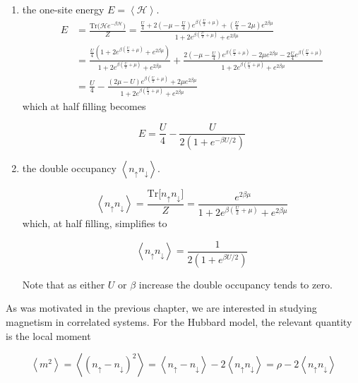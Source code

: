 \begin{enumerate}
\item the one-site energy $E = \left\langle \mathcal{H} \right\rangle$.
\begin{equation}
\begin{split}
E &= \frac{\text{Tr}\bigg( \mathcal{H}e^{-\beta\mathcal{H} } \bigg)}{Z} = \frac{ \frac{U}{4} + 2 ( -\mu - \frac{U}{4} ) e^{\beta(\frac{U}{2} + \mu )} + (\frac{U}{4} - 2\mu ) e^{2\beta\mu}}{1 + 2 e^{\beta (\frac{U}{2} + \mu )} + e^{2\beta\mu} } \\
&= \frac{ \frac{U}{4} ( 1 + 2 e^{\beta (\frac{U}{2} + \mu )} + e^{2\beta\mu} )}{1 + 2 e^{\beta (\frac{U}{2} + \mu )} + e^{2\beta\mu} } + \frac{2(-\mu - \frac{U}{4}) e^{\beta(\frac{U}{2} + \mu)} - 2\mu e^{2\beta\mu} - 2\frac{U}{4} e^{\beta (\frac{U}{2} + \mu)} }{1 + 2 e^{\beta (\frac{U}{2} + \mu )} + e^{2\beta\mu}} \\
&= \frac{U}{4} - \frac{ (2\mu - U) e^{\beta(\frac{U}{2} + \mu) } + 2\mu e^{2\beta\mu} }{1 + 2 e^{\beta (\frac{U}{2} + \mu )} + e^{2\beta\mu} }
\end{split}
\end{equation}
which at half filling becomes

\begin{equation}
E = \frac{U}{4} - \frac{U}{2 ( 1 + e^{-\beta U /2} )}
\end{equation}

\item the double occupancy $\left\langle n_\uparrow n_\downarrow \right\rangle$.

\begin{equation}
\left\langle n_\uparrow n_\downarrow \right\rangle = \frac{\text{Tr} \big[ n_\uparrow n_\downarrow \big]}{Z} = \frac{e^{2\beta\mu}}{1 + 2 e^{\beta (\frac{U}{2} + \mu )} + e^{2\beta\mu}}
\end{equation}
which, at half filling, simplifies to

\begin{equation}
\left\langle n_\uparrow n_\downarrow \right\rangle = \frac{1}{2 ( 1 + e^{\beta U/2} )}
\end{equation}

Note that as either $U$ or $\beta$ increase the double occupancy tends to zero.
\end{enumerate}

As was motivated in the previous chapter, we are interested in studying magnetism in correlated systems.
For the Hubbard model, the relevant quantity is the local moment

\begin{equation}
\left\langle m^2 \right\rangle = \left\langle ( n_\uparrow - n_\downarrow )^2 \right\rangle = \left\langle n_\uparrow - n_\downarrow \right\rangle - 2  \left\langle n_\uparrow n_\downarrow \right\rangle = \rho - 2  \left\langle n_\uparrow n_\downarrow \right\rangle
\end{equation}


